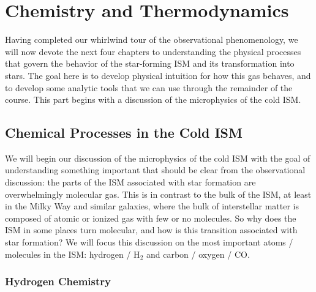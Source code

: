 \chapter{Chemistry and Thermodynamics}
\label{ch:microphysics}


Having completed our whirlwind tour of the observational phenomenology, we will now devote the next four chapters to understanding the physical processes that govern the behavior of the star-forming ISM and its transformation into stars. The goal here is to develop physical intuition for how this gas behaves, and to develop some analytic tools that we can use through the remainder of the course. This part begins with a discussion of the microphysics of the cold ISM.

\section{Chemical Processes in the Cold ISM}

We will begin our discussion of the microphysics of the cold ISM with the goal of understanding something important that should be clear from the observational discussion: the parts of the ISM associated with star formation are overwhelmingly molecular gas. This is in contrast to the bulk of the ISM, at least in the Milky Way and similar galaxies, where the bulk of interstellar matter is composed of atomic or ionized gas with few or no molecules. So why does the ISM in some places turn molecular, and how is this transition associated with star formation? We will focus this discussion on the most important atoms / molecules in the ISM: hydrogen / H$_2$ and carbon / oxygen / CO.

\subsection{Hydrogen Chemistry}

